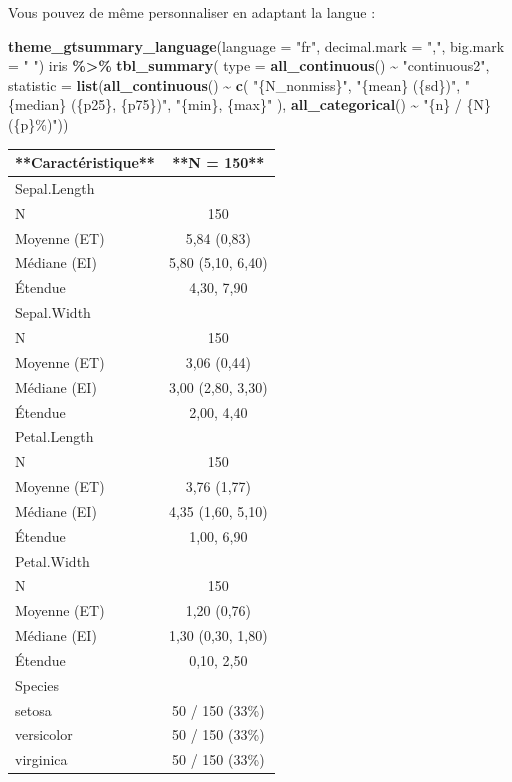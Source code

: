 \documentclass[
]{book}
\newenvironment{Shaded}{\begin{snugshade}}{\end{snugshade}}
\newcommand{\AttributeTok}[1]{\textcolor[rgb]{0.13,0.29,0.53}{#1}}
\newcommand{\FunctionTok}[1]{\textcolor[rgb]{0.13,0.29,0.53}{\textbf{#1}}}
\newcommand{\NormalTok}[1]{#1}
\newcommand{\SpecialCharTok}[1]{\textcolor[rgb]{0.81,0.36,0.00}{\textbf{#1}}}
\newcommand{\StringTok}[1]{\textcolor[rgb]{0.31,0.60,0.02}{#1}}
\begin{document}
Vous pouvez de même personnaliser en adaptant la langue :

\begin{Shaded}
\begin{Highlighting}[]
\FunctionTok{theme\_gtsummary\_language}\NormalTok{(}\AttributeTok{language =} \StringTok{"fr"}\NormalTok{, }\AttributeTok{decimal.mark =} \StringTok{","}\NormalTok{, }\AttributeTok{big.mark =} \StringTok{" "}\NormalTok{)}
\NormalTok{iris }\SpecialCharTok{\%\textgreater{}\%}
  \FunctionTok{tbl\_summary}\NormalTok{(}
    \AttributeTok{type =} \FunctionTok{all\_continuous}\NormalTok{() }\SpecialCharTok{\textasciitilde{}} \StringTok{"continuous2"}\NormalTok{,}
    \AttributeTok{statistic =} \FunctionTok{list}\NormalTok{(}\FunctionTok{all\_continuous}\NormalTok{() }\SpecialCharTok{\textasciitilde{}} \FunctionTok{c}\NormalTok{(}
      \StringTok{"\{N\_nonmiss\}"}\NormalTok{,}
      \StringTok{"\{mean\} (\{sd\})"}\NormalTok{,}
      \StringTok{"\{median\} (\{p25\}, \{p75\})"}\NormalTok{,}
      \StringTok{"\{min\}, \{max\}"}
\NormalTok{    ), }\FunctionTok{all\_categorical}\NormalTok{() }\SpecialCharTok{\textasciitilde{}} \StringTok{"\{n\} / \{N\} (\{p\}\%)"}\NormalTok{))}
\end{Highlighting}
\end{Shaded}

\begin{tabular}{l|c}
\hline
**Caractéristique** & **N = 150**\\
\hline
Sepal.Length & \\
\hline
N & 150\\
\hline
Moyenne (ET) & 5,84 (0,83)\\
\hline
Médiane (EI) & 5,80 (5,10, 6,40)\\
\hline
Étendue & 4,30, 7,90\\
\hline
Sepal.Width & \\
\hline
N & 150\\
\hline
Moyenne (ET) & 3,06 (0,44)\\
\hline
Médiane (EI) & 3,00 (2,80, 3,30)\\
\hline
Étendue & 2,00, 4,40\\
\hline
Petal.Length & \\
\hline
N & 150\\
\hline
Moyenne (ET) & 3,76 (1,77)\\
\hline
Médiane (EI) & 4,35 (1,60, 5,10)\\
\hline
Étendue & 1,00, 6,90\\
\hline
Petal.Width & \\
\hline
N & 150\\
\hline
Moyenne (ET) & 1,20 (0,76)\\
\hline
Médiane (EI) & 1,30 (0,30, 1,80)\\
\hline
Étendue & 0,10, 2,50\\
\hline
Species & \\
\hline
setosa & 50 / 150 (33\%)\\
\hline
versicolor & 50 / 150 (33\%)\\
\hline
virginica & 50 / 150 (33\%)\\
\hline
\end{tabular}
\end{document}
